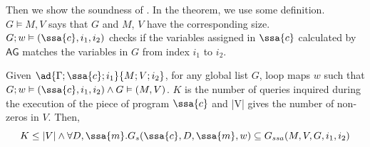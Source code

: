 Then we show the soundness of {\THESYSTEM}. In the theorem, we use some definition. $G \vDash M, V$ says that $G$ and $M$, $V$ have the corresponding size. $G; w \vDash (\ssa{c}, i_1,i_2)$ checks if the variables assigned in $\ssa{c}$ calculated by $\mathsf{AG}$ matches the variables in $G$ from index $i_1$ to $i_2$.

\begin{thm}
Given $ \ad{\Gamma; \ssa{c}; i_1 }{M; V;i_2}$,  for any global list $G$,  loop maps $w$ such that $G ;w \vDash (\ssa{c}, i_1, i_2) \land G \vDash (M,V)$. $K$ is the number of queries inquired during the execution of the piece of program $\ssa{c}$ and |V| gives the number of non-zeros in $V$. 
Then,
\[
K \leq |V| \land \forall D, \ssa{m}. G_{s}(\ssa{c},D,\ssa{m},w) \subseteq G_{ssa}(M, V,G,i_1, i_2)
\]      
\end{thm}
